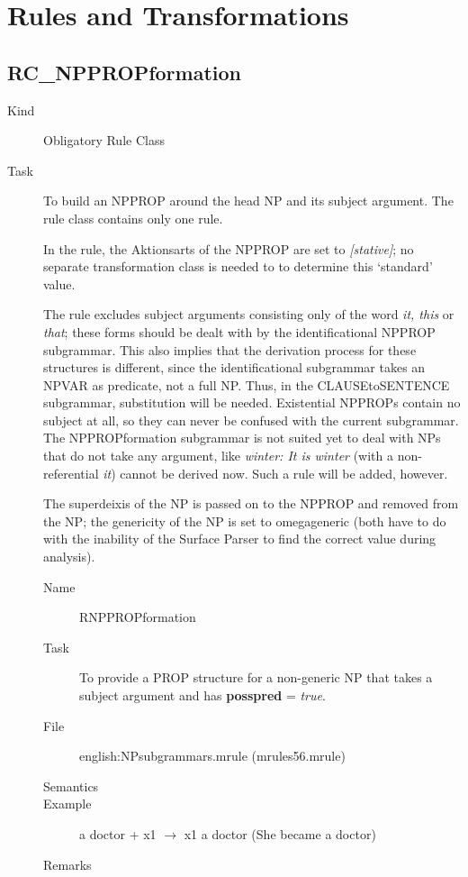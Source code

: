 \newpage
\section{Rules and Transformations}

\subsection{RC\_NPPROPformation}
\begin{description}
\item[Kind] Obligatory Rule Class
\item[Task] To build an NPPROP around the head NP and its subject argument. The 
rule class contains only one rule.

In the rule, the Aktionsarts of the NPPROP are set to {\em [stative]\/};
no separate transformation class is needed to to determine this `standard'
value. 

The rule excludes subject arguments consisting only of the word {\em it, 
this\/} or {\em that\/}; these forms should be dealt with by the 
identificational 
NPPROP subgrammar. This also implies that the derivation process for these 
structures is different, since the 
identificational subgrammar takes an NPVAR as predicate, not a full NP. Thus, 
in the CLAUSEtoSENTENCE subgrammar, substitution will be needed.
Existential NPPROPs contain no subject at all, 
so they can never be confused with the current subgrammar. The NPPROPformation 
subgrammar is not suited yet to deal with NPs that do not take any argument, 
like {\em winter: It is winter\/} (with a non-referential {\em it\/}) cannot 
be derived now. Such a rule will be added, however.

The superdeixis of the NP is passed on to the NPPROP and removed from the NP; 
the genericity of the NP is set to omegageneric (both have to do with the 
inability of the Surface Parser to find the correct value during analysis).

\vspace{1 cm}
\begin{description}
\item[Name] RNPPROPformation
\item[Task] To provide a PROP structure for a non-generic NP that takes a 
subject argument and has {\bf posspred} = {\em true\/}.
\item[File] english:NPsubgrammars.mrule (mrules56.mrule)
\item[Semantics]
\item[Example] a doctor + x1 $\rightarrow$ x1 a doctor (She became a doctor)
\item[Remarks]
\end{description}


\end{description}
